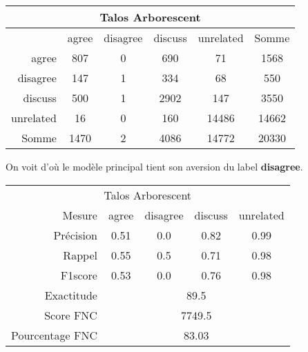 \documentclass[onecolumn, 12pt]{article}
\begin{document}
\begin{center}
 \begin{tabular}{ r | c c c c | c }
  \multicolumn{6}{c}{Talos Arborescent}                      \\
  \hline
            & agree & disagree & discuss & unrelated & Somme \\
  \hline
  agree     & 807   & 0        & 690     & 71        & 1568  \\
  disagree  & 147   & 1        & 334     & 68        & 550   \\
  discuss   & 500   & 1        & 2902    & 147       & 3550  \\
  unrelated & 16    & 0        & 160     & 14486     & 14662 \\
  \hline
  Somme     & 1470  & 2        & 4086    & 14772     & 20330 \\
 \end{tabular}
\end{center}



On voit d'où le modèle principal tient son aversion du label \textbf{disagree}.

\begin{center}
 \begin{tabular}{ r | c c c c }
  \multicolumn{5}{c}{Talos Arborescent}                                         \\
  Mesure          & agree                      & disagree & discuss & unrelated \\
  \hline
  Précision       & 0.51                       & 0.0      & 0.82    & 0.99      \\
  Rappel          & 0.55                       & 0.5      & 0.71    & 0.98      \\
  F1score         & 0.53                       & 0.0      & 0.76    & 0.98      \\
  \hline
  \hline
  Exactitude      & \multicolumn{4}{c}{89.5}                                    \\
  Score FNC       & \multicolumn{4}{c}{7749.5}                                  \\
  Pourcentage FNC & \multicolumn{4}{c}{83.03}                                   \\
 \end{tabular}
\end{center}
\end{document}
